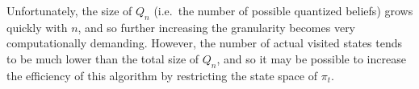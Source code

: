 \documentclass{article}
\begin{document}
Unfortunately, the size of \(Q_n\) (i.e.\ the number of possible quantized beliefs) grows quickly with \(n\), and so further increasing the granularity becomes very computationally demanding. However, the number of actual visited states tends to be much lower than the total size of \(Q_n\), and so it may be possible to increase the efficiency of this algorithm by restricting the state space of \(\pi_t\).

\printbibliography %
\end{document}
